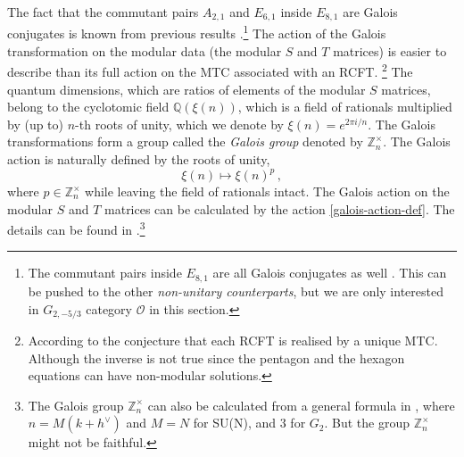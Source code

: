\documentclass[a4paper,12pt]{article}
\begin{document}
The fact that the commutant pairs $A_{2,1}$ and $E_{6,1}$ inside $E_{8,1}$ are Galois conjugates is known from previous results \cite{rowell2009classification}.\footnote{The commutant pairs inside $E_{8,1}$ are all Galois conjugates as well \cite{rowell2009classification}. This can be pushed to the other \textit{non-unitary counterparts}, but we are only interested in $G_{2,-5/3}$ category $\mathcal{O}$ in this section.}
The action of the Galois transformation on the modular data (the modular $S$ and $T$ matrices) is easier to describe than its full action on the MTC associated with an RCFT. \footnote{According to the conjecture that each RCFT is realised by a unique MTC. Although the inverse is not true since the pentagon and the hexagon equations can have non-modular solutions.} The quantum dimensions, which are ratios of elements of the modular $S$ matrices, belong to the cyclotomic field $\mathbb{Q}(\xi(n))$, which is a field of rationals multiplied by (up to) $n$-th roots of unity, which we denote by $\xi(n)=e^{2\pi i /n}$. The Galois transformations form a group called the \textit{Galois group} denoted by $\mathbb{Z}_{n}^{\times}$. The Galois action is naturally defined by the roots of unity,
\begin{equation}\label{galois-action-def}
\xi(n)\mapsto\xi(n)^p\, ,
\end{equation}
where $p\in\mathbb{Z}_{n}^{\times}$ while leaving the field of rationals intact. The Galois action on the modular $S$ and $T$ matrices can be calculated by the action \eqref{galois-action-def}. The details can be found in \cite{Coste:1993af, Harvey:2018rdc, DiFrancesco:1997nk}.\footnote{The Galois group $\mathbb{Z}_n^\times$ can also be calculated from a general formula in \cite{DiFrancesco:1997nk}, where $n=M(k+h^{\vee})$ and $M=N$ for SU(N), and 3 for $G_2$. But the group $\mathbb{Z}_n^\times$ might not be faithful.}
\end{document}
